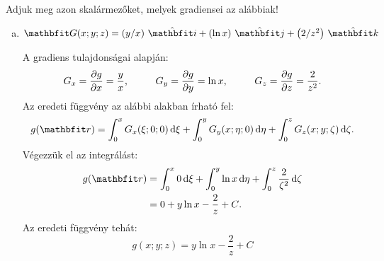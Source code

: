 \documentclass[exercise]{math-standalone}
\begin{document}
\begin{exercise}{Adjuk meg azon skalármezőket, melyek gradiensei az alábbiak!}
{\begin{enumerate}[a)]
      \item $\rvec G(x;y;z) = \ijk{y/x}{\ln x}{2/z^{2}}$

            \vspace{3mm}
            A gradiens tulajdonságai alapján:
            \[
              G_x = \pdv{g}{x} = \frac{y}{x}
              \text,\hspace{1cm}
              G_y = \pdv{g}{y} = \ln x
              \text,\hspace{1cm}
              G_z = \pdv{g}{z} = \frac{2}{z^2}
              \text.
            \]
            Az eredeti függvény az alábbi alakban írható fel:
            \[
              g(\rvec r) =
              \int_0^x G_x(\xi; 0; 0) \,\diff \xi +
              \int_0^y G_y(x; \eta; 0) \,\diff \eta +
              \int_0^z G_z(x; y; \zeta) \,\diff \zeta
              \text.
            \]
            Végezzük el az integrálást:
            \begin{align*}
              g(\rvec r)
               & =
              \int_0^x 0 \,\diff \xi +
              \int_0^y \ln x \,\diff \eta +
              \int_0^z \frac{2}{\zeta^2} \,\diff \zeta
              \\
               & =
              0 + y \ln x - \frac{2}{z} + C
              \text.
            \end{align*}
            Az eredeti függvény tehát:
            \[
              g(x;y;z) = y \ln x - \frac{2}{z} + C
            \]
    \end{enumerate}
  }
\end{exercise}
\end{document}
